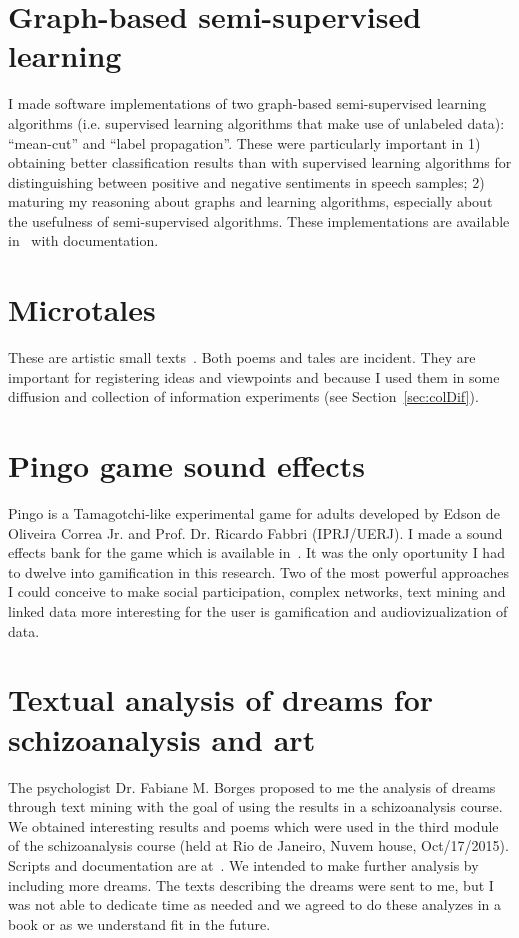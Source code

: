 \begin{apendicesenv}
\section{Graph-based semi-supervised learning}
I made software implementations of two graph-based semi-supervised learning algorithms
(i.e. supervised learning algorithms that make use of unlabeled data):
``mean-cut'' and ``label propagation''.
These were particularly important in 1) obtaining better classification results
than with supervised learning algorithms for distinguishing between positive
and negative sentiments in speech samples; 2) maturing my reasoning about graphs
and learning algorithms, especially about the usefulness of semi-supervised algorithms.
These implementations are available in~\cite{ssl} with documentation.

\section{Microtales}
These are artistic small texts~\cite{microcontos}.
Both poems and tales are incident.
They are important for registering ideas and viewpoints
and because I used them in some diffusion and collection of information experiments
(see Section~\ref{sec:colDif}).

\section{Pingo game sound effects}
Pingo is a Tamagotchi-like experimental game for adults
developed by Edson de Oliveira Correa Jr. and Prof. Dr. Ricardo Fabbri (IPRJ/UERJ).
I made a sound effects bank for the game which is available in~\cite{pingo}.
It was the only oportunity I had to dwelve into gamification in this research.
Two of the most powerful approaches I could conceive to make social participation, 
complex networks, text mining and linked data more interesting for the
user is gamification and audiovizualization of data.

\section{Textual analysis of dreams for schizoanalysis and art}
The psychologist Dr. Fabiane M. Borges proposed to me the analysis of dreams through text mining
with the goal of using the results in a schizoanalysis course.
We obtained interesting results and poems which were used in
the third module of the schizoanalysis course (held at Rio de Janeiro,
Nuvem house, Oct/17/2015).
Scripts and documentation are at~\cite{sonhos}.
We intended to make further analysis by including more dreams.
The texts describing the dreams were sent to me, but I was not able to dedicate time
as needed and we agreed to do these analyzes in a book or
as we understand fit in the future.


\end{apendicesenv}

